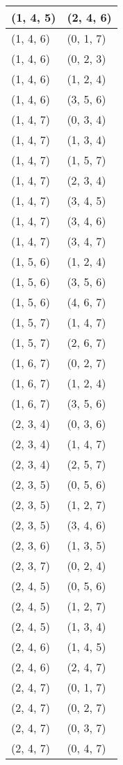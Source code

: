 \begin{footnotesize}
\begin{longtable}[c]{|l|l|}
(1, 4, 5)
&(2, 4, 6)
\\ \hline
(1, 4, 6)
&(0, 1, 7)
\\ \hline
(1, 4, 6)
&(0, 2, 3)
\\ \hline
(1, 4, 6)
&(1, 2, 4)
\\ \hline
(1, 4, 6)
&(3, 5, 6)
\\ \hline
(1, 4, 7)
&(0, 3, 4)
\\ \hline
(1, 4, 7)
&(1, 3, 4)
\\ \hline
(1, 4, 7)
&(1, 5, 7)
\\ \hline
(1, 4, 7)
&(2, 3, 4)
\\ \hline
(1, 4, 7)
&(3, 4, 5)
\\ \hline
(1, 4, 7)
&(3, 4, 6)
\\ \hline
(1, 4, 7)
&(3, 4, 7)
\\ \hline
(1, 5, 6)
&(1, 2, 4)
\\ \hline
(1, 5, 6)
&(3, 5, 6)
\\ \hline
(1, 5, 6)
&(4, 6, 7)
\\ \hline
(1, 5, 7)
&(1, 4, 7)
\\ \hline
(1, 5, 7)
&(2, 6, 7)
\\ \hline
(1, 6, 7)
&(0, 2, 7)
\\ \hline
(1, 6, 7)
&(1, 2, 4)
\\ \hline
(1, 6, 7)
&(3, 5, 6)
\\ \hline
(2, 3, 4)
&(0, 3, 6)
\\ \hline
(2, 3, 4)
&(1, 4, 7)
\\ \hline
(2, 3, 4)
&(2, 5, 7)
\\ \hline
(2, 3, 5)
&(0, 5, 6)
\\ \hline
(2, 3, 5)
&(1, 2, 7)
\\ \hline
(2, 3, 5)
&(3, 4, 6)
\\ \hline
(2, 3, 6)
&(1, 3, 5)
\\ \hline
(2, 3, 7)
&(0, 2, 4)
\\ \hline
(2, 4, 5)
&(0, 5, 6)
\\ \hline
(2, 4, 5)
&(1, 2, 7)
\\ \hline
(2, 4, 5)
&(1, 3, 4)
\\ \hline
(2, 4, 6)
&(1, 4, 5)
\\ \hline
(2, 4, 6)
&(2, 4, 7)
\\ \hline
(2, 4, 7)
&(0, 1, 7)
\\ \hline
(2, 4, 7)
&(0, 2, 7)
\\ \hline
(2, 4, 7)
&(0, 3, 7)
\\ \hline
(2, 4, 7)
&(0, 4, 7)
\\ \hline

\end{longtable}
\end{footnotesize}
